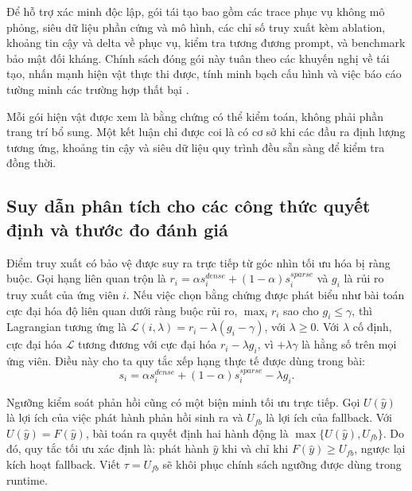 ﻿\documentclass[a4paper,12pt]{article}
\begin{document}
Để hỗ trợ xác minh độc lập, gói tái tạo bao gồm các trace phục vụ không mô phỏng, siêu dữ liệu phần cứng và mô hình, các chỉ số truy xuất kèm ablation, khoảng tin cậy và delta về phục vụ, kiểm tra tương đương prompt, và benchmark bảo mật đối kháng. Chính sách đóng gói này tuân theo các khuyến nghị về tái tạo, nhấn mạnh hiện vật thực thi được, tính minh bạch cấu hình và việc báo cáo tường minh các trường hợp thất bại \cite{Pineau2021Reproducibility}.

Mỗi gói hiện vật được xem là bằng chứng có thể kiểm toán, không phải phần trang trí bổ sung. Một kết luận chỉ được coi là có cơ sở khi các đầu ra định lượng tương ứng, khoảng tin cậy và siêu dữ liệu quy trình đều sẵn sàng để kiểm tra đồng thời.

\subsection{Suy dẫn phân tích cho các công thức quyết định và thước đo đánh giá}
Điểm truy xuất có bảo vệ được suy ra trực tiếp từ góc nhìn tối ưu hóa bị ràng buộc. Gọi hạng liên quan trộn là \(r_i=\alpha s_i^{dense}+(1-\alpha)s_i^{sparse}\) và \(g_i\) là rủi ro truy xuất của ứng viên \(i\). Nếu việc chọn bằng chứng được phát biểu như bài toán cực đại hóa độ liên quan dưới ràng buộc rủi ro, \(\max_i r_i\) sao cho \(g_i\le\gamma\), thì Lagrangian tương ứng là \(\mathcal{L}(i,\lambda)=r_i-\lambda(g_i-\gamma)\), với \(\lambda\ge0\). Với \(\lambda\) cố định, cực đại hóa \(\mathcal{L}\) tương đương với cực đại hóa \(r_i-\lambda g_i\), vì \(+\lambda\gamma\) là hằng số trên mọi ứng viên. Điều này cho ta quy tắc xếp hạng thực tế được dùng trong bài:
\begin{equation}
s_i=\alpha s_i^{dense}+(1-\alpha)s_i^{sparse}-\lambda g_i.
\end{equation}

Ngưỡng kiểm soát phản hồi cũng có một biện minh tối ưu trực tiếp. Gọi \(U(\hat{y})\) là lợi ích của việc phát hành phản hồi sinh ra và \(U_{fb}\) là lợi ích của fallback. Với \(U(\hat{y})=F(\hat{y})\), bài toán ra quyết định hai hành động là \(\max\{U(\hat{y}),U_{fb}\}\). Do đó, quy tắc tối ưu xác định là: phát hành \(\hat{y}\) khi và chỉ khi \(F(\hat{y})\ge U_{fb}\), ngược lại kích hoạt fallback. Viết \(\tau=U_{fb}\) sẽ khôi phục chính sách ngưỡng được dùng trong runtime.
\end{document}
